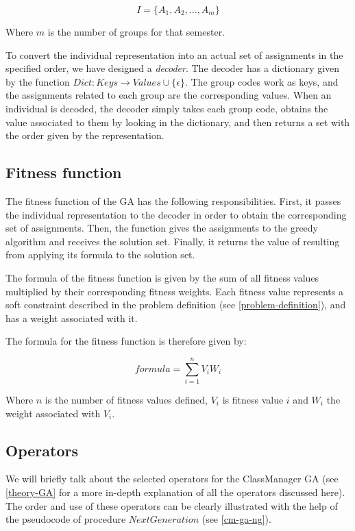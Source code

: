 \begin{equation}
    I = \{ A_{1}, A_{2}, ..., A_{m}\}
\end{equation}

Where $m$ is the number of groups for that semester.

To convert the individual representation into an actual set of assignments in the specified order, we have designed a \textit{decoder}. The decoder has a dictionary given by the function $Dict: Keys \rightarrow Values \cup \{ \epsilon \}$. The group codes work as keys, and the assignments related to each group are the corresponding values. When an individual is decoded, the decoder simply takes each group code, obtains the value associated to them by looking in the dictionary, and then returns a set with the order given by the representation.


\subsection{Fitness function}

The fitness function of the GA has the following responsibilities. First, it passes the individual representation to the decoder in order to obtain the corresponding set of assignments. Then, the function gives the assignments to the greedy algorithm and receives the solution set. Finally, it returns the value of resulting from applying its formula to the solution set. 

The formula of the fitness function is given by the sum of all fitness values multiplied by their corresponding fitness weights. Each fitness value represents a soft constraint described in the problem definition (see \ref{problem-definition}), and has a weight associated with it. 

The formula for the fitness function is therefore given by:

\begin{equation}
    formula = \sum_{i=1}^{n} V_{i} W_{i}
\end{equation}

Where $n$ is the number of fitness values defined, $V_{i}$ is fitness value $i$ and $W_{i}$ the weight associated with $V_{i}$.


\subsection{Operators}

We will briefly talk about the selected operators for the ClassManager GA (see \ref{theory-GA} for a more in-depth explanation of all the operators discussed here). The order and use of these operators can be clearly illustrated with the help of the pseudocode of procedure $NextGeneration$ (see \ref{cm-ga-ng}).


